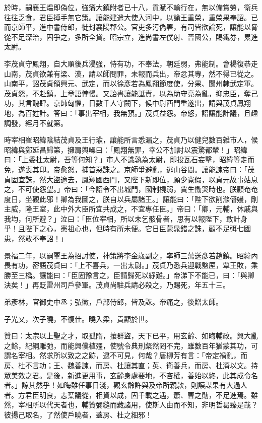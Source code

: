 \begin{pinyinscope}
 於時，嗣襄王煴即偽位，強籓大鎮附者已十八，貢賦不輸行在，無以備賞勞，衛兵往往乏食，君臣搏手無它策。讓能建遣大使入河中，以諭王重榮，重榮果奉詔。已而京師平，進中書侍郎，徙封襄陽郡公。官吏多污偽署，有司皆欲論死，讓能以脅從不足深治，固爭之，多所全貸。昭宗立，進尚書左僕射、晉國公，賜鐵券，累進太尉。



 李茂貞守鳳翔，自大順後兵浸強，恃有功，不奉法，朝廷弱，弗能制。會楊復恭走山南，茂貞欲兼有梁、漢，請以師問罪，未報而兵出，帝忿其專，然不得已從之。山南平，詔茂貞領興元、武定，而以徐彥若為鳳翔節度使，分果、閬州隸武定軍。茂貞怨，不赴鎮，上章語悖慢。又詒書讓能詆責，以為助守亮為亂，抑忠臣，奪己功，其言醜肆。京師匈懼，日數千人守闕下，候中尉西門重遂出，請與茂貞鳳翔地，為百姓計。答曰：「事出宰相，我無預。」茂貞益怨。帝怒，詔讓能計議，且趣調發，經月不就第。



 時宰相崔昭緯陰結茂貞及王行瑜，讓能所言悉漏之，茂貞乃以健兒數百雜市人，候昭緯與鄭延昌歸第，擁肩輿噪曰：「鳳翔無罪，幸公不加討以震驚都輦！」昭緯曰：「上委杜太尉，吾等何知？」市人不識孰為太尉，即投瓦石妄擊，昭緯等走而免，遂喪其印。帝愈怒，捕首惡誅之。京師爭避亂，逃山谷間。讓能諫帝曰：「茂貞固宜誅，然大盜適去，鳳翔國西門，又陛下新即位，願少寬假，以貞元故事姑息之，不可使怨望。」帝曰：「今詔令不出城門，國制橈弱，賈生慟哭時也。朕顧奄奄度日，坐觀此邪！卿為我圖之，朕自以兵屬諸王。」讓能曰：「陛下欲削滌僭嫚，剛主威，隆王室，此中外大臣所宜共成之，不宜專任臣。」帝曰：「卿，元輔，休戚與我均，何所避？」泣曰：「臣位宰相，所以未乞骸骨者，思有以報陛下，敢計身乎！且陛下之心，憲祖心也，但時有所未便。它日臣蒙晁錯之誅，顧不足弭七國患，然敢不奉詔！」



 景福二年，以嗣覃王為招討使，神策將李金歲副之，率師三萬送彥若趙鎮。昭緯內畏有功，密語茂貞曰：「上不喜兵，一出太尉。」茂貞乃悉兵迎戰盩厔，覃王敗，乘勝至三橋。讓能曰：「臣固豫言之，臣請歸死以紓難。」帝涕下不能已，曰：「與卿決矣！」再貶雷州司戶參軍。茂貞尚駐兵請必殺之，乃賜死，年五十三。



 弟彥林，官御史中丞；弘徽，戶部侍郎，皆及誅。帝痛之，後贈太師。



 子光乂，次子曉，不復仕。曉入梁，貴顯於世。



 贊曰：太宗以上聖之才，取孤隋，攘群盜，天下已平，用玄齡、如晦輔政。興大亂之餘，紀綱雕弛，而能興僕植殭，使號令典刑粲然罔不完，雖數百年猶蒙其功，可謂名宰相。然求所以致之之跡，逮不可見，何哉？唐柳芳有言：「帝定禍亂，而房、杜不言功；王、魏善諫，而房、杜讓其直；英、衛善兵，而房、杜濟以文。持眾美效之君。是後，新進更用事，玄齡身處要地，不吝權，善始以終，此其成令名者。」諒其然乎！如晦雖任事日淺，觀玄齡許與及帝所親款，則謨謀果有大過人者。方君臣明良，志葉議從，相資以成，固千載之遇，蕭、曹之勛，不足進焉。雖然，宰相所以代天者也，輔贊彌縫而藏諸用，使斯人由而不知，非明哲曷臻是哉？彼揚己取名，了然使戶曉者，蓋房、杜之細邪！



\end{pinyinscope}